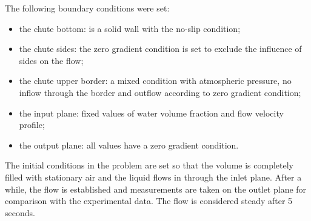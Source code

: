 \documentclass[sensors,article,submit,moreauthors,pdftex]{Definitions/mdpi}
\begin{document}
The following boundary conditions were set:

\begin{itemize}
    \item the chute bottom: is a solid wall with the no-slip condition;
    \item the chute sides: the zero gradient condition is set to exclude the     influence of sides on the flow;
    \item the chute upper border: a mixed condition with atmospheric pressure,     no inflow through the border and outflow according to zero gradient     condition;
    \item the input plane: fixed values of water volume fraction and flow velocity profile;
    \item the output plane: all values have a zero gradient condition.
\end{itemize}

The initial conditions in the problem are set so that the volume is completely filled with stationary air and the liquid flows in through the inlet plane. After a while, the flow is established and measurements are taken on the outlet plane for comparison with the experimental data. The flow is considered steady after 5 seconds.


\end{document}
